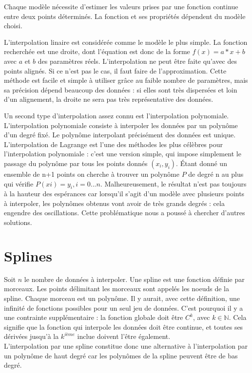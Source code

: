 \documentclass[a4paper,12pt]{article} %
\begin{document}
    Chaque modèle nécessite d'estimer les valeurs prises par une fonction continue entre deux points déterminés. La fonction et ses propriétés dépendent du modèle choisi. 
	
	L'interpolation linaire est considérée comme le modèle le plus simple. La fonction recherchée est une droite, dont l'équation est donc de la forme $f(x)=a*x+b$ avec $a$ et $b$ des paramètres réels. L'interpolation ne peut être faite qu'avec des points alignés. Si ce n'est pas le cas, il faut faire de l'approximation. Cette méthode est facile et simple à utiliser grâce au faible nombre de paramètres, mais sa précision dépend beaucoup des données : si elles sont très dispersées et loin d'un alignement, la droite ne sera pas très représentative des données.
	
    Un second type d'interpolation assez connu est l'interpolation polynomiale. L'interpolation polynomiale consiste à interpoler les données par un polynôme d'un degré fixé. Le polynôme interpolant précisément des données est unique. L'interpolation de Lagrange est l'une des méthodes les plus célèbres pour l'interpolation polynomiale : c'est une version simple, qui impose simplement le passage du polynôme par tous les points donnés $(x_i,y_i)$. Étant donné un ensemble de n+1 points  on cherche à trouver un polynôme $P$ de degré n au plus qui vérifie $P(xi)=y_i  ,i=0...n$. Malheureusement, le résultat n'est pas toujours à la hauteur des espérances car lorsqu'il s'agit d'un modèle avec plusieurs points à interpoler, les polynômes obtenus vont avoir de très grands degrés : cela engendre des oscillations. Cette problématique nous a poussé à chercher d'autres solutions. 

	\section{Splines}
	    Soit $n$ le nombre de données à interpoler.
	    Une spline est une fonction définie par morceaux. Les points délimitant les morceaux sont appelés les noeuds de la spline. Chaque morceau est un polynôme. Il y aurait, avec cette définition, une infinité de fonctions possibles pour un seul jeu de données. C'est pourquoi il y a une contrainte supplémentaire : la fonction globale doit être $C^k$, avec $k\in\mathbb{N}$. Cela signifie que la fonction qui interpole les données doit être continue, et toutes ses dérivées jusqu'à la $k^{ième}$ inclue doivent l'être également.\\
	    
	    L'interpolation par une spline constitue donc une alternative à l'interpolation par un polynôme de haut degré car les polynômes de la spline peuvent être de bas degré.
		
\end{document}
